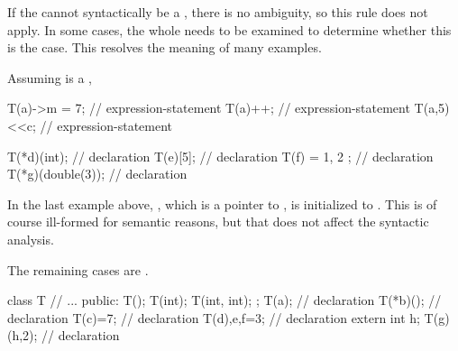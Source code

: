 \pnum
\begin{note}
If the  cannot syntactically be a
, there is no ambiguity,
so this rule does not apply.
In some cases, the whole  needs to be examined
to determine whether this is the case. This resolves the meaning
of many examples.
\begin{example}
Assuming  is a
,

\begin{codeblock}
T(a)->m = 7;        // expression-statement
T(a)++;             // expression-statement
T(a,5)<<c;          // expression-statement

T(*d)(int);         //  declaration
T(e)[5];            //  declaration
T(f) = { 1, 2 };    //  declaration
T(*g)(double(3));   //  declaration
\end{codeblock}

In the last example above, , which is a pointer to ,
is initialized to . This is of course ill-formed for
semantic reasons, but that does not affect the syntactic analysis.
\end{example}

The remaining cases are .
\begin{example}
\begin{codeblock}
class T {
  // ...
public:
  T();
  T(int);
  T(int, int);
};
T(a);               //  declaration
T(*b)();            //  declaration
T(c)=7;             //  declaration
T(d),e,f=3;         //  declaration
extern int h;
T(g)(h,2);          //  declaration
\end{codeblock}
\end{example}
\end{note}


